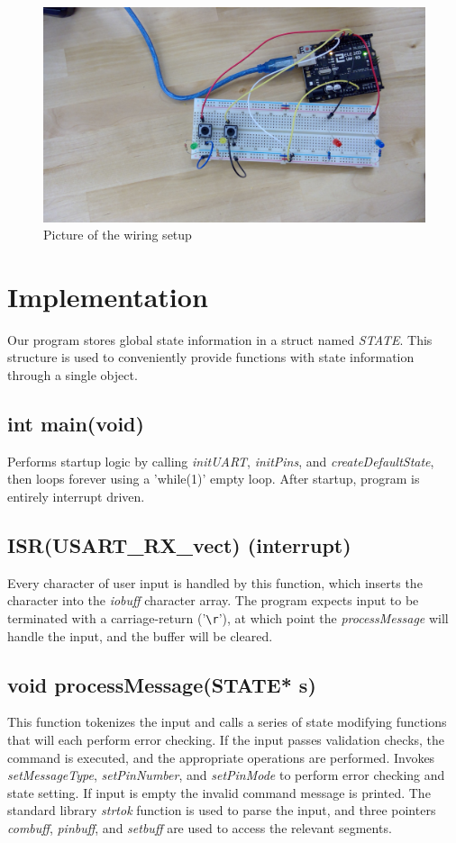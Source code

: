 \documentclass[letterpaper,11pt]{texMemo} %
\begin{document}
\begin{figure}[!ht]
\begin{center}
\includegraphics[width=\linewidth]{./configuration.jpg}
\caption{Picture of the wiring setup}
\end{center}
\end{figure}

\newpage
\section*{Implementation}
Our program stores global state information in a struct named \textit{STATE}. This structure is used to conveniently provide functions with state information through a single object.

\subsection*{int main(void)}
Performs startup logic by calling \textit{initUART}, \textit{initPins}, and \textit{createDefaultState}, then loops forever using a 'while(1)' empty loop. After startup, program is entirely interrupt driven.

\subsection*{ISR(USART\_RX\_vect) (interrupt)}
Every character of user input is handled by this function, which inserts the character into the \textit{iobuff} character array. The program expects input to be terminated with a carriage-return ('\verb+\r+'), at which point the \textit{processMessage} will handle the input, and the buffer will be cleared.
\subsection*{void processMessage(STATE* s)}
This function tokenizes the input and calls a series of state modifying functions that will each perform error checking. If the input passes validation checks, the command is executed, and the appropriate operations are performed.
Invokes \textit{setMessageType}, \textit{setPinNumber}, and \textit{setPinMode} to perform error checking and state setting. If input is empty the invalid command message is printed. The standard library \textit{strtok} function is used to parse the input, and three pointers \textit{combuff}, \textit{pinbuff}, and \textit{setbuff} are used to access the relevant segments.
\end{document}

